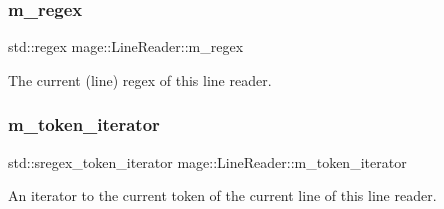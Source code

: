 \subsubsection{\texorpdfstring{m\+\_\+regex}{m\_regex}}
{\footnotesize\ttfamily std\+::regex mage\+::\+Line\+Reader\+::m\+\_\+regex\hspace{0.3cm}{\ttfamily [private]}}

The current (line) regex of this line reader. \mbox{\label{classmage_1_1_line_reader_aa6e1c2a165ce99a124de1b257f1c0f36}} 
\subsubsection{\texorpdfstring{m\+\_\+token\+\_\+iterator}{m\_token\_iterator}}
{\footnotesize\ttfamily std\+::sregex\+\_\+token\+\_\+iterator mage\+::\+Line\+Reader\+::m\+\_\+token\+\_\+iterator\hspace{0.3cm}{\ttfamily [private]}}

An iterator to the current token of the current line of this line reader. 